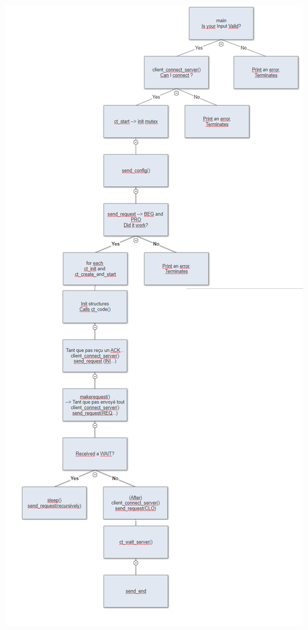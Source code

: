 \documentclass[11pt]{article}
\begin{document}
\includegraphics[width=\textwidth,height=\textheight,keepaspectratio]{CLIENT}
\end{document}
